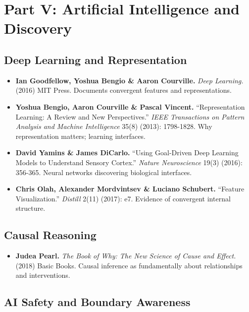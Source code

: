 \documentclass[
  openright]{book}
\providecommand{\tightlist}{%
  \setlength{\itemsep}{0pt}\setlength{\parskip}{0pt}}
\begin{document}
\section{Part V: Artificial Intelligence and
Discovery}\label{part-v-artificial-intelligence-and-discovery}

\subsection{Deep Learning and
Representation}\label{deep-learning-and-representation}

\begin{itemize}
\item
  \textbf{Ian Goodfellow, Yoshua Bengio \& Aaron Courville.} \emph{Deep
  Learning.} (2016) MIT Press. Documents convergent features and
  representations.
\item
  \textbf{Yoshua Bengio, Aaron Courville \& Pascal Vincent.}
  ``Representation Learning: A Review and New Perspectives.'' \emph{IEEE
  Transactions on Pattern Analysis and Machine Intelligence} 35(8)
  (2013): 1798-1828. Why representation matters; learning interfaces.
\item
  \textbf{David Yamins \& James DiCarlo.} ``Using Goal-Driven Deep
  Learning Models to Understand Sensory Cortex.'' \emph{Nature
  Neuroscience} 19(3) (2016): 356-365. Neural networks discovering
  biological interfaces.
\item
  \textbf{Chris Olah, Alexander Mordvintsev \& Luciano Schubert.}
  ``Feature Visualization.'' \emph{Distill} 2(11) (2017): e7. Evidence
  of convergent internal structure.
\end{itemize}

\subsection{Causal Reasoning}\label{causal-reasoning}

\begin{itemize}
\tightlist
\item
  \textbf{Judea Pearl.} \emph{The Book of Why: The New Science of Cause
  and Effect.} (2018) Basic Books. Causal inference as fundamentally
  about relationships and interventions.
\end{itemize}

\subsection{AI Safety and Boundary
Awareness}\label{ai-safety-and-boundary-awareness}
\end{document}
